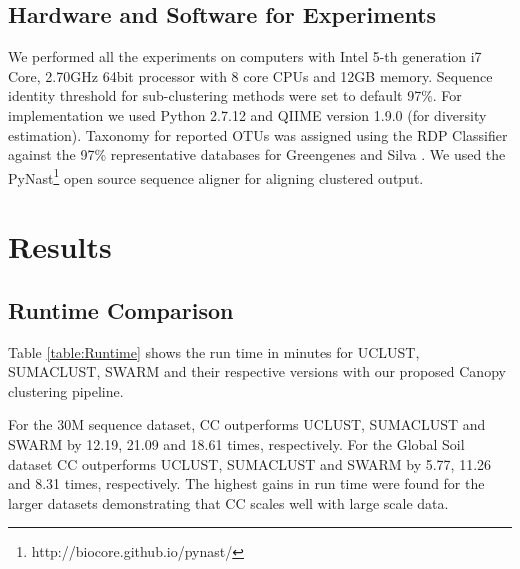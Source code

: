 \documentclass[10pt, conference, compsocconf]{IEEEtran}
\begin{document}
    

\subsection{\textbf{Hardware and Software for Experiments}}
We performed all the experiments on computers with Intel 5-th 
generation i7 Core,   2.70GHz 64bit processor with 8 core CPUs and 
12GB memory. Sequence identity threshold for  
sub-clustering methods were set to default 97\%. For implementation we 
used Python 2.7.12 and QIIME \cite{MARQiime} version 1.9.0 (for diversity estimation).  Taxonomy for reported OTUs was assigned 
using the RDP Classifier \cite{MARRdp} against the 97\% representative databases for Greengenes \cite{MARGreen1} and Silva \cite{MARSilva}. We
used the PyNast\footnote{http://biocore.github.io/pynast/} open source sequence aligner
  for aligning clustered output. 

\section{Results} 
\label{sec:Results}

\subsection{\textbf{Runtime Comparison}} Table \ref{table:Runtime} shows the run time in minutes for 
UCLUST, SUMACLUST, SWARM and their respective versions with our proposed Canopy clustering pipeline.


For the 30M sequence dataset, 
CC outperforms UCLUST, SUMACLUST and SWARM by 12.19, 21.09 and 18.61 times, respectively. For the Global Soil dataset 
CC outperforms UCLUST, SUMACLUST and SWARM by 5.77, 11.26 and 8.31 times, 
respectively. The highest gains in run time were found for the 
larger datasets demonstrating that 
CC scales well with large scale data.  

\end{document}
